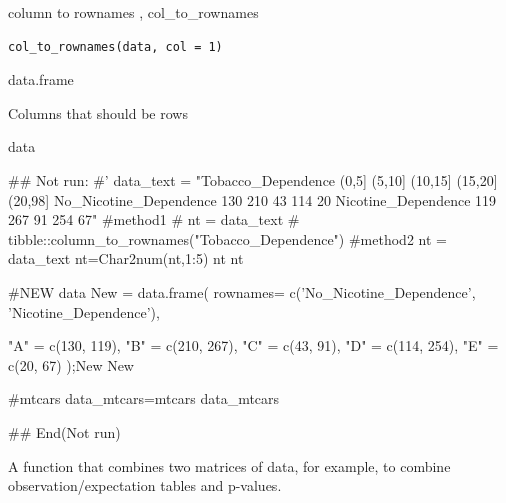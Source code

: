 \documentclass[a4paper]{book}
\begin{document}
%
\begin{Description}
column to rownames , col\_to\_rownames
\end{Description}
%
\begin{Usage}
\begin{verbatim}
col_to_rownames(data, col = 1)
\end{verbatim}
\end{Usage}
%
\begin{Arguments}
\begin{ldescription}
\item[\code{data}] data.frame

\item[\code{col}] Columns that should be rows
\end{ldescription}
\end{Arguments}
%
\begin{Value}
data
\end{Value}
%
\begin{Examples}
\begin{ExampleCode}

\#\# Not run: 
#'
data_text = "Tobacco_Dependence (0,5] (5,10] (10,15] (15,20] (20,98]
No_Nicotine_Dependence 130 210 43 114 20
Nicotine_Dependence 119 267 91 254 67"
#method1
# nt = data_text%
#         tibble::column_to_rownames("Tobacco_Dependence")
#method2
nt = data_text%
nt=Char2num(nt,1:5)
nt
nt %

#NEW data
New = data.frame(
  rownames= c('No_Nicotine_Dependence', 'Nicotine_Dependence'),

  "A" = c(130, 119),
  "B" = c(210, 267),
  "C" = c(43, 91),
  "D" = c(114, 254),
  "E" = c(20, 67)
);New
New%

#mtcars
data_mtcars=mtcars%
data_mtcars%




## End(Not run)


\end{ExampleCode}
\end{Examples}
%
\begin{Description}
A function that combines two matrices of data, for example, to combine observation/expectation tables and p-values.
\end{Description}
\end{document}
